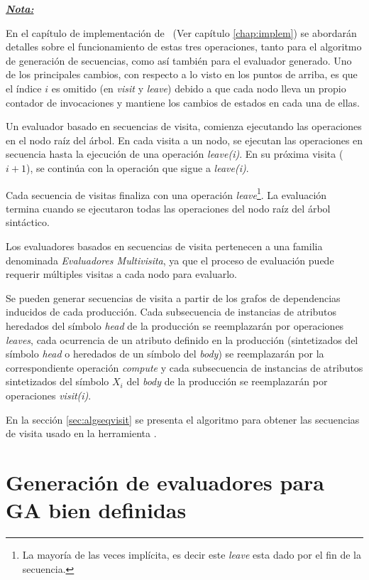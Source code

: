 \underline{\textit{\textbf{Nota:}}}

En el capítulo de implementación de \maggen\ (Ver capítulo \ref{chap:implem}) se abordarán detalles sobre el funcionamiento de estas tres operaciones, tanto para el algoritmo de generación de secuencias, como así también para el evaluador generado. Uno de los principales cambios, con respecto a lo visto en los puntos de arriba, es que el índice $i$ es omitido (en \emph{visit} y \emph{leave}) debido a que cada nodo lleva un propio contador de invocaciones y mantiene los cambios de estados en cada una de ellas.  

Un evaluador basado en secuencias de visita, comienza ejecutando las operaciones en el nodo raíz del árbol. En cada visita a un nodo, se ejecutan las operaciones en secuencia hasta la ejecución de una operación \emph{leave(i)}.
En su próxima visita ($i+1$), se continúa con la operación que sigue a \emph{leave(i)}.

Cada secuencia de visitas finaliza con una operación \emph{leave}\footnote{La mayoría de las veces implícita, es decir este \emph{leave} esta dado por el fin de la secuencia.}. La evaluación termina cuando se ejecutaron todas las operaciones del nodo raíz del árbol sintáctico.

Los evaluadores basados en secuencias de visita pertenecen a una familia denominada \emph{Evaluadores Multivisita}, ya que el proceso de evaluación puede requerir múltiples visitas a cada nodo para evaluarlo.

Se pueden generar secuencias de visita a partir de los grafos de dependencias inducidos de cada producción. Cada subsecuencia de instancias de atributos heredados del símbolo \textit{head} de la producción se reemplazarán por operaciones \emph{leaves}, cada ocurrencia de un atributo definido en la producción (sintetizados del símbolo \textit{head} o heredados de un símbolo del \textit{body}) se reemplazarán por la correspondiente operación \emph{compute} y cada subsecuencia de instancias de atributos sintetizados del símbolo $X_i$ del \textit{body} de la producción se reemplazarán por operaciones \emph{visit(i)}.

En la sección \ref{sec:algseqvisit} se presenta el algoritmo para obtener las secuencias de visita usado en la herramienta \maggen.

\section{Generación de evaluadores para GA bien definidas}

